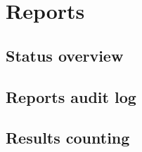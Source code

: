 \chapter{Reports}\label{cha:reports}

\section{Status overview}\label{sec:status-overview}

\section{Reports audit log}\label{sec:reports-audit-log}

\section{Results counting}\label{sec:results-counting}

